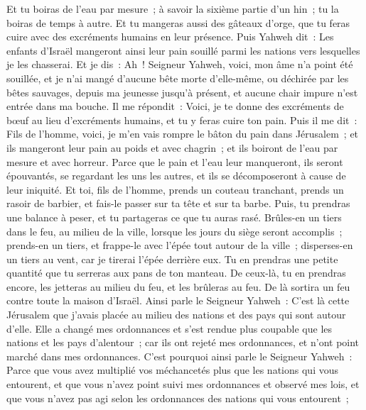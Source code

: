 \begin{multicols}{2}
Et tu boiras de l'eau par mesure~; à savoir la sixième partie d'un hin~; tu la boiras de temps à autre.
Et tu mangeras aussi des gâteaux d'orge, que tu feras cuire avec des excréments humains en leur présence.
Puis Yahweh dit~: Les enfants d'Israël mangeront ainsi leur pain souillé parmi les nations vers lesquelles je les chasserai.
Et je dis~: Ah~! Seigneur Yahweh, voici, mon âme n'a point été souillée, et je n'ai mangé d'aucune bête morte d'elle-même, ou déchirée par les bêtes sauvages, depuis ma jeunesse jusqu'à présent, et aucune chair impure n'est entrée dans ma bouche.
Il me répondit~: Voici, je te donne des excréments de bœuf au lieu d'excréments humains, et tu y feras cuire ton pain.
Puis il me dit~: Fils de l'homme, voici, je m'en vais rompre le bâton du pain dans Jérusalem~; et ils mangeront leur pain au poids et avec chagrin~; et ils boiront de l'eau par mesure et avec horreur.
Parce que le pain et l'eau leur manqueront, ils seront épouvantés, se regardant les uns les autres, et ils se décomposeront à cause de leur iniquité.
\VerseOne{}Et toi, fils de l'homme, prends un couteau tranchant, prends un rasoir de barbier, et fais-le passer sur ta tête et sur ta barbe. Puis, tu prendras une balance à peser, et tu partageras ce que tu auras rasé.
Brûles-en un tiers dans le feu, au milieu de la ville, lorsque les jours du siège seront accomplis~; prends-en un tiers, et frappe-le avec l'épée tout autour de la ville~; disperses-en un tiers au vent, car je tirerai l'épée derrière eux.
Tu en prendras une petite quantité que tu serreras aux pans de ton manteau.
De ceux-là, tu en prendras encore, les jetteras au milieu du feu, et les brûleras au feu. De là sortira un feu contre toute la maison d'Israël.
Ainsi parle le Seigneur Yahweh~: C'est là cette Jérusalem que j'avais placée au milieu des nations et des pays qui sont autour d'elle.
Elle a changé mes ordonnances et s'est rendue plus coupable que les nations et les pays d'alentour~; car ils ont rejeté mes ordonnances, et n'ont point marché dans mes ordonnances.
C'est pourquoi ainsi parle le Seigneur Yahweh~: Parce que vous avez multiplié vos méchancetés plus que les nations qui vous entourent, et que vous n'avez point suivi mes ordonnances et observé mes lois, et que vous n'avez pas agi selon les ordonnances des nations qui vous entourent~;

\end{multicols}
